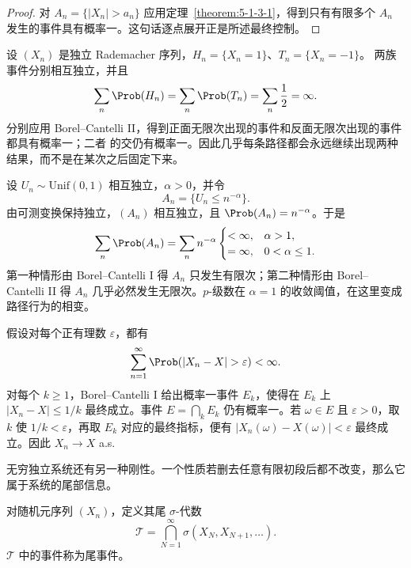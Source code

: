 \begin{proof}
对 $A_n=\{|X_n|>a_n\}$ 应用定理~\ref{theorem:5-1-3-1}，得到只有有限多个 $A_n$
发生的事件具有概率一。这句话逐点展开正是所述最终控制。
\end{proof}

\begin{example}[抛硬币无限正面]\label{ex:5-1-3-1}
设 $(X_n)$ 是独立 Rademacher 序列，$H_n=\{X_n=1\}$、$T_n=\{X_n=-1\}$。
两族事件分别相互独立，并且
\[
 \sum_n\Prob(H_n)=\sum_n\Prob(T_n)=\sum_n\frac12=\infty.
\]
分别应用 Borel--Cantelli II，得到正面无限次出现的事件和反面无限次出现的事件都具有概率一；二者
的交仍有概率一。因此几乎每条路径都会永远继续出现两种结果，而不是在某次之后固定下来。
\end{example}

\begin{example}[稀有事件的可和阈值]\label{ex:5-1-3-threshold}
设 $U_n\sim\mathrm{Unif}(0,1)$ 相互独立，$\alpha>0$，并令
\[
 A_n=\{U_n\le n^{-\alpha}\}.
\]
由可测变换保持独立，$(A_n)$ 相互独立，且
$\Prob(A_n)=n^{-\alpha}$。于是
\[
 \sum_n\Prob(A_n)=\sum_n n^{-\alpha}
 \begin{cases}
 <\infty,&\alpha>1,\\
 =\infty,&0<\alpha\le1.
 \end{cases}
\]
第一种情形由 Borel--Cantelli I 得 $A_n$ 只发生有限次；第二种情形由 Borel--Cantelli II 得
$A_n$ 几乎必然发生无限次。$p$-级数在 $\alpha=1$ 的收敛阈值，在这里变成路径行为的相变。
\end{example}

\begin{example}[从可和尾界读出收敛速度]\label{ex:5-1-3-2}
假设对每个正有理数 $\varepsilon$，都有
\[
 \sum_{n=1}^\infty\Prob(|X_n-X|>\varepsilon)<\infty.
\]
对每个 $k\ge1$，Borel--Cantelli I 给出概率一事件 $E_k$，使得在 $E_k$ 上
$|X_n-X|\le1/k$ 最终成立。事件 $E=\bigcap_kE_k$ 仍有概率一。若 $\omega\in E$ 且
$\varepsilon>0$，取 $k$ 使 $1/k<\varepsilon$，再取 $E_k$ 对应的最终指标，便有
$|X_n(\omega)-X(\omega)|<\varepsilon$ 最终成立。因此 $X_n\to X$ a.s.
\end{example}

无穷独立系统还有另一种刚性。一个性质若删去任意有限初段后都不改变，那么它属于系统的尾部信息。

\begin{definition}[尾 $\sigma$-代数]\label{def:5-1-3-2}
对随机元序列 $(X_n)$，定义其尾 $\sigma$-代数
\[
 \mathcal T=\bigcap_{N=1}^\infty\sigma(X_N,X_{N+1},\ldots).
\]
$\mathcal T$ 中的事件称为尾事件。
\end{definition}

